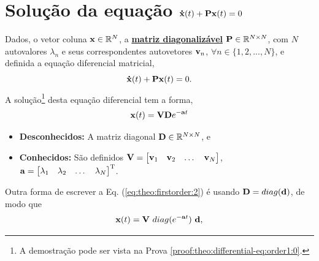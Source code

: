 \section{ Solução da equação $\DTVECTOR{x}(t) + \MATRIX{P} \VECTOR{x}(t)=0$ }

\begin{theorem}[Equação 
$\DTVECTOR{x}(t) + \MATRIX{P} \VECTOR{x}(t)=0$ com matriz $\MATRIX{P}$ diagonalizável:]
\label{theo:differential-eq:order1:0}
Dados, o vetor coluna $\VECTOR{x} \in \mathbb{R}^N$, 
a \hyperref[def:diagonalization0]{\textbf{matriz diagonalizável}} $\MATRIX{P} \in \mathbb{R}^{N\times N}$,
com $N$ autovalores $\lambda_n$ e seus correspondentes autovetores $\VECTOR{v}_n$,
$\forall n \in \{1, 2, ..., N\}$, 
e definida a equação diferencial matricial,
\begin{equation}\label{eq:theo:firstorder:1}
\DTVECTOR{x}(t) + \MATRIX{P} \VECTOR{x}(t)=0.
\end{equation}
A solução\footnote{A
demostração pode ser vista na Prova \ref{proof:theo:differential-eq:order1:0}.} desta equação diferencial tem  a forma,
\begin{equation}\label{eq:theo:firstorder:2}
 \VECTOR{x}(t)= \MATRIX{V}\MATRIX{D} e^{-\VECTOR{a}t}
\end{equation}
\begin{itemize}
\item \textbf{Desconhecidos:} A matriz diagonal $\MATRIX{D} \in \mathbb{R}^{N \times N}$, e
\item  \textbf{Conhecidos:} São definidos $\MATRIX{V}=
\begin{bmatrix}
\VECTOR{v}_1 & \VECTOR{v}_2 & \dots & \VECTOR{v}_N
\end{bmatrix}$, 
$\VECTOR{a}=
\begin{bmatrix}
\lambda_1 & \lambda_2 & \dots & \lambda_N
\end{bmatrix}^{\transpose}$.
\end{itemize}
\end{theorem}

\begin{corollary}
\label{coro:differential-eq:order1:0}
Outra forma de escrever a Eq. (\ref{eq:theo:firstorder:2}) é usando $\MATRIX{D}=\funcdiag(\VECTOR{d})$, de modo que
\begin{equation}\label{eq:coro:firstorder:1}
 \VECTOR{x}(t)= \MATRIX{V}~\funcdiag(e^{-\VECTOR{a}t})~\VECTOR{d},
\end{equation}
\end{corollary}

